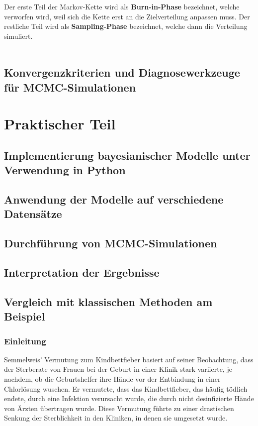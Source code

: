 \documentclass[a4paper,12pt]{article}
\begin{document}
Der erste Teil der Markov-Kette wird als \textbf{Burn-in-Phase} bezeichnet, welche verworfen wird, weil sich die Kette erst an die Zielverteilung anpassen muss. Der restliche Teil wird als \textbf{Sampling-Phase} bezeichnet, welche dann die Verteilung simuliert. \parencite[226f.]{HandbookMonteCarloMethods} \\\\

\subsection{Konvergenzkriterien und Diagnosewerkzeuge für MCMC-Simulationen}
\newpage

\section{Praktischer Teil}

\subsection{Implementierung bayesianischer Modelle unter Verwendung in Python}
\newpage

\subsection{Anwendung der Modelle auf verschiedene Datensätze}
\newpage

\subsection{Durchführung von MCMC-Simulationen}
\newpage

\subsection{Interpretation der Ergebnisse}
\newpage

\subsection{Vergleich mit klassischen Methoden am Beispiel}

\subsubsection{Einleitung}
Semmelweis' Vermutung zum Kindbettfieber basiert auf seiner Beobachtung, dass der Sterberate von Frauen bei der Geburt 
in einer Klinik stark variierte, je nachdem, ob die Geburtshelfer ihre Hände vor der Entbindung in einer Chlorlösung wuschen. 
Er vermutete, dass das Kindbettfieber, das häufig tödlich endete, durch eine Infektion verursacht wurde, 
die durch nicht desinfizierte Hände von Ärzten übertragen wurde. Diese Vermutung führte zu einer 
drastischen Senkung der Sterblichkeit in den Kliniken, in denen sie umgesetzt wurde.
\parencite[3]{StatistikKlassischOderBayes} \\\\
\end{document}
